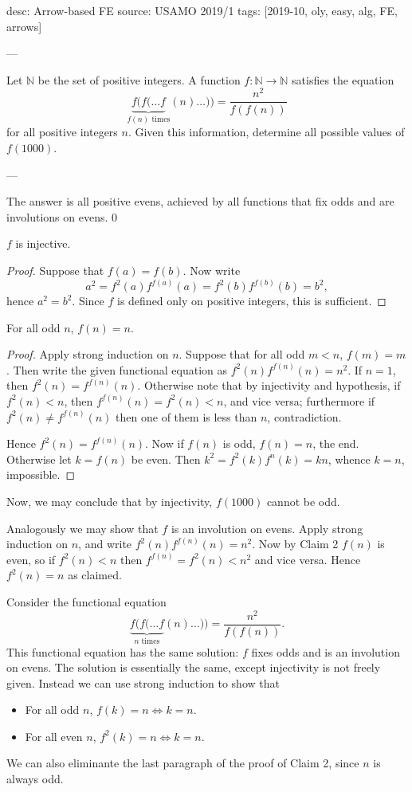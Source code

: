 desc: Arrow-based FE
source: USAMO 2019/1
tags: [2019-10, oly, easy, alg, FE, arrows]

---

Let $\mathbb N$ be the set of positive integers. A function $f:\mathbb N\to\mathbb N$ satisfies the equation \[\underbrace{f(f(\ldots f}_{f(n)\text{ times}}(n)\ldots))=\frac{n^2}{f(f(n))}\]
for all positive integers $n$. Given this information, determine all possible values of $f(1000)$.

---

The answer is all positive evens, achieved by all functions that fix odds and are involutions on evens.
\setcounter{iclaim}0
\begin{iclaim}
    $f$ is injective.
\end{iclaim}
\begin{proof}
    Suppose that $f(a)=f(b)$. Now write \[a^2=f^2(a)f^{f(a)}(a)=f^2(b)f^{f(b)}(b)=b^2,\]
    hence $a^2=b^2$. Since $f$ is defined only on positive integers, this is sufficient.
\end{proof}
\begin{iclaim}
    For all odd $n$, $f(n)=n$.
\end{iclaim}
\begin{proof}
    Apply strong induction on $n$. Suppose that for all odd $m<n$, $f(m)=m$. Then write the given functional equation as $f^2(n)f^{f(n)}(n)=n^2$. If $n=1$, then $f^2(n)=f^{f(n)}(n)$. Otherwise note that by injectivity and hypothesis, if $f^2(n)<n$, then $f^{f(n)}(n)=f^2(n)<n$, and vice versa; furthermore if $f^2(n)\ne f^{f(n)}(n)$ then one of them is less than $n$, contradiction.

    Hence $f^2(n)=f^{f(n)}(n)$. Now if $f(n)$ is odd, $f(n)=n$, the end. Otherwise let $k=f(n)$ be even. Then $k^2=f^2(k)f^n(k)=kn$, whence $k=n$, impossible.
\end{proof}

Now, we may conclude that by injectivity, $f(1000)$ cannot be odd.
\begin{boxremark}
    Analogously we may show that $f$ is an involution on evens. Apply strong induction on $n$, and write $f^2(n)f^{f(n)}(n)=n^2$. Now by Claim 2 $f(n)$ is even, so if $f^2(n)<n$ then $f^{f(n)}=f^2(n)<n^2$ and vice versa. Hence $f^2(n)=n$ as claimed.
\end{boxremark}
\begin{boxremark}
    Consider the functional equation \[\underbrace{f(f(\ldots f}_{n\text{ times}}(n)\ldots))=\frac{n^2}{f(f(n))}.\]
    This functional equation has the same solution: $f$ fixes odds and is an involution on evens. The solution is essentially the same, except injectivity is not freely given. Instead we can use strong induction to show that
    \begin{itemize}
        \item For all odd $n$, $f(k)=n\iff k=n$.
        \item For all even $n$, $f^2(k)=n\iff k=n$.
    \end{itemize}
    We can also eliminante the last paragraph of the proof of Claim 2, since $n$ is always odd.
\end{boxremark}
